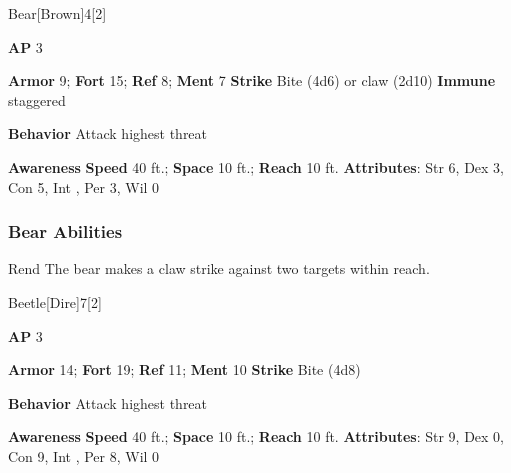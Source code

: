 \begin{monsection}{Bear}[Brown]{4}[2]
\vspace{-1em}\vspace{-1em}
\begin{spellcontent}
\begin{spelltargetinginfo}
{\textbf{AP} 3}

\pari \textbf{Armor} 9;
\textbf{Fort} 15;
\textbf{Ref} 8;
\textbf{Ment} 7
\pari \textbf{Strike} Bite  (4d6) or claw  (2d10)
\pari \textbf{Immune} staggered


\pari \textbf{Behavior} Attack highest threat
\end{spelltargetinginfo}
\end{spellcontent}

\begin{monsterfooter}
\pari \textbf{Awareness} 
\pari \textbf{Speed} 40 ft.;
\textbf{Space} 10 ft.;
\textbf{Reach} 10 ft.
\pari \textbf{Attributes}:
Str 6,
Dex 3,
Con 5,
Int ,
Per 3,
Wil 0
\end{monsterfooter}
\end{monsection}


\subsubsection{Bear Abilities}

\begin{ability}{Rend}
The bear makes a claw strike against two targets within reach.
\end{ability}

\begin{monsection}{Beetle}[Dire]{7}[2]
\vspace{-1em}\vspace{-1em}
\begin{spellcontent}
\begin{spelltargetinginfo}
{\textbf{AP} 3}

\pari \textbf{Armor} 14;
\textbf{Fort} 19;
\textbf{Ref} 11;
\textbf{Ment} 10
\pari \textbf{Strike} Bite  (4d8)



\pari \textbf{Behavior} Attack highest threat
\end{spelltargetinginfo}
\end{spellcontent}

\begin{monsterfooter}
\pari \textbf{Awareness} 
\pari \textbf{Speed} 40 ft.;
\textbf{Space} 10 ft.;
\textbf{Reach} 10 ft.
\pari \textbf{Attributes}:
Str 9,
Dex 0,
Con 9,
Int ,
Per 8,
Wil 0
\end{monsterfooter}
\end{monsection}

